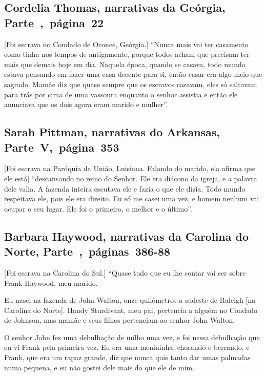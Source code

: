 \subsection{Cordelia Thomas, narrativas da Geórgia, Parte~,~página~22}

{[}Foi escrava no Condado de Oconee, Geórgia.{]} ``Nunca mais vai ter casamento como tinha nos tempos de antigamente,
porque todos acham que precisam ter mais que demais hoje em dia. Naquela
época, quando se casava, todo mundo estava pensando em fazer uma casa
decente para si, então casar era algo meio que sagrado. Mamãe diz que
quase sempre que os escravos casavam, eles só saltavam para trás por
cima de uma vassoura enquanto o senhor assistia e então ele anunciava
que os dois agora eram marido e mulher''.

\subsection{Sarah Pittman, narrativas do Arkansas, Parte~V,~página~353}

{[}Foi escrava na Paróquia da União, Luisiana. Falando do marido, ela afirma que ele está{]} ``descansando no reino
do Senhor. Ele era diácono da igreja, e a palavra dele valia. A fazenda
inteira escutava ele e fazia o que ele dizia. Todo mundo respeitava ele,
pois ele era direito. Eu só me casei uma vez, e homem nenhum vai ocupar
o seu lugar. Ele foi o primeiro, o melhor e o último''.

\subsection{Barbara Haywood, narrativas da Carolina do Norte, Parte~,~páginas~386-88}
\label{ref131}

{[}Foi escrava na Carolina do Sul.{]} ``Quase tudo que eu lhe contar vai ser sobre Frank Haywood, meu marido.

Eu nasci na fazenda de John Walton, onze quilômetros a sudeste de
Raleigh {[}na Carolina do Norte{]}. Handy Sturdivant, meu pai, pertencia
a alguém no Condado de Johnson, mas mamãe e seus filhos pertenciam ao
senhor John Walton.

O senhor John fez uma debulhação de milho uma vez, e foi nessa
debulhação que eu vi Frank pela primeira vez. Eu era uma menininha,
chorando e berrando, e Frank, que era um rapaz grande, diz que nunca
quis tanto dar umas palmadas numa pequena, e eu não gostei dele mais do
que ele de mim.

